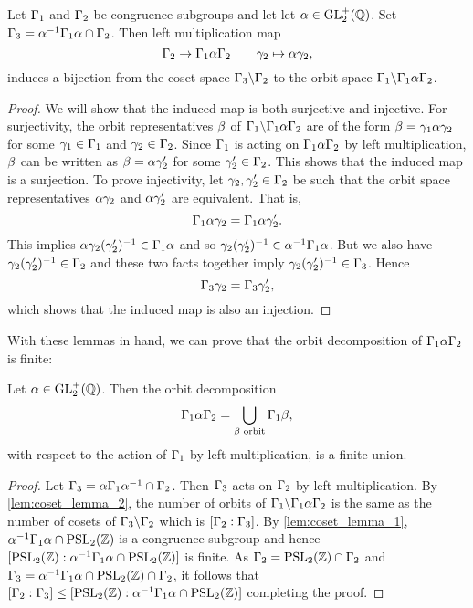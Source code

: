       \begin{lemma}\label{lem:coset_lemma_2}
        Let $\Gamma_{1}$ and $\Gamma_{2}$ be congruence subgroups and let let $\alpha \in \mathrm{GL}_{2}^{+}(\mathbb{Q})$. Set $\Gamma_{3} = \alpha^{-1}\Gamma_{1}\alpha \cap \Gamma_{2}$. Then left multiplication map
        \[
          \Gamma_{2} \to \Gamma_{1}\alpha\Gamma_{2} \qquad \gamma_{2} \mapsto \alpha\gamma_{2},
        \]
        induces a bijection from the coset space $\Gamma_{3}\backslash\Gamma_{2}$ to the orbit space $\Gamma_{1}\backslash\Gamma_{1}\alpha\Gamma_{2}$.
      \end{lemma}
      \begin{proof}
        We will show that the induced map is both surjective and injective. For surjectivity, the orbit representatives $\beta$ of $\Gamma_{1}\backslash\Gamma_{1}\alpha\Gamma_{2}$ are of the form $\beta = \gamma_{1}\alpha\gamma_{2}$ for some $\gamma_{1} \in \Gamma_{1}$ and $\gamma_{2} \in \Gamma_{2}$. Since $\Gamma_{1}$ is acting on $\Gamma_{1}\alpha\Gamma_{2}$ by left multiplication, $\beta$ can be written as $\beta = \alpha\gamma'_{2}$ for some $\gamma'_{2} \in \Gamma_{2}$. This shows that the induced map is a surjection. To prove injectivity, let $\gamma_{2},\gamma'_{2} \in \Gamma_{2}$ be such that the orbit space representatives $\alpha\gamma_{2}$ and $\alpha\gamma'_{2}$ are equivalent. That is,
        \[
          \Gamma_{1}\alpha\gamma_{2} = \Gamma_{1}\alpha\gamma'_{2}.
        \]
        This implies $\alpha\gamma_{2}(\gamma'_{2})^{-1} \in \Gamma_{1}\alpha$ and so $\gamma_{2}(\gamma'_{2})^{-1} \in \alpha^{-1}\Gamma_{1}\alpha$. But we also have $\gamma_{2}(\gamma'_{2})^{-1} \in \Gamma_{2}$ and these two facts together imply $\gamma_{2}(\gamma'_{2})^{-1} \in \Gamma_{3}$. Hence
        \[
          \Gamma_{3}\gamma_{2} = \Gamma_{3}\gamma'_{2},
        \]
        which shows that the induced map is also an injection.
      \end{proof}

      With these lemmas in hand, we can prove that the orbit decomposition of $\Gamma_{1}\alpha\Gamma_{2}$ is finite:

      \begin{proposition}\label{prop:double_congruence_subgroup_coset_decomposition_is_finite}
        Let $\alpha \in \mathrm{GL}_{2}^{+}(\mathbb{Q})$. Then the orbit decomposition
        \[
          \Gamma_{1}\alpha\Gamma_{2} = \bigcup_{\beta \text{ orbit}}\Gamma_{1}\beta,
        \]
        with respect to the action of $\Gamma_{1}$ by left multiplication, is a finite union.
      \end{proposition}
      \begin{proof}
        Let $\Gamma_{3} = \alpha\Gamma_{1}\alpha^{-1} \cap \Gamma_{2}$. Then $\Gamma_{3}$ acts on $\Gamma_{2}$ by left multiplication. By \cref{lem:coset_lemma_2}, the number of orbits of $\Gamma_{1}\backslash\Gamma_{1}\alpha\Gamma_{2}$ is the same as the number of cosets of $\Gamma_{3}\backslash\Gamma_{2}$ which is $[\Gamma_{2}:\Gamma_{3}]$. By \cref{lem:coset_lemma_1}, $\alpha^{-1}\Gamma_{1}\alpha \cap \mathrm{PSL}_{2}(\mathbb{Z})$ is a congruence subgroup and hence $[\mathrm{PSL}_{2}(\mathbb{Z}):\alpha^{-1}\Gamma_{1}\alpha \cap \mathrm{PSL}_{2}(\mathbb{Z})]$ is finite. As $\Gamma_{2} = \mathrm{PSL}_{2}(\mathbb{Z}) \cap \Gamma_{2}$ and $\Gamma_{3} = \alpha^{-1}\Gamma_{1}\alpha \cap \mathrm{PSL}_{2}(\mathbb{Z}) \cap \Gamma_{2}$, it follows that $[\Gamma_{2}:\Gamma_{3}] \le [\mathrm{PSL}_{2}(\mathbb{Z}):\alpha^{-1}\Gamma_{1}\alpha \cap \mathrm{PSL}_{2}(\mathbb{Z})]$ completing the proof.
      \end{proof}

